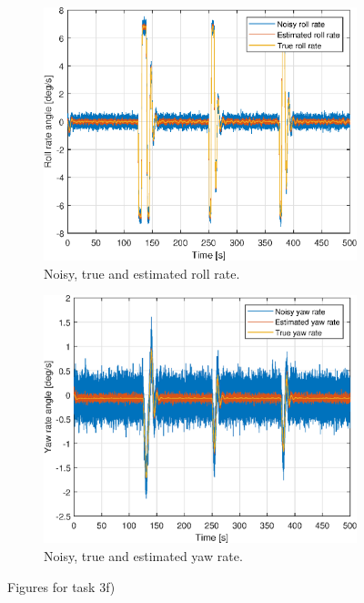 \begin{figure}[ht]
\begin{subfigure}[b]{0.45\textwidth}
		\includegraphics[width=\textwidth]{figures/3f/roll_rate_p.eps}
		\caption{Noisy, true and estimated roll rate. }
		\label{fig:3f_roll_rate_p}
	\end{subfigure}
	\begin{subfigure}[b]{0.45\textwidth}
		\includegraphics[width=\textwidth]{figures/3f/yaw_rate_r.eps}
		\caption{Noisy, true and estimated yaw rate. }
		\label{fig:3f_yaw_rate_r}
	\end{subfigure}		
	\caption{Figures for task 3f)}\label{fig:3f}
\end{figure}

\subsection{} %

